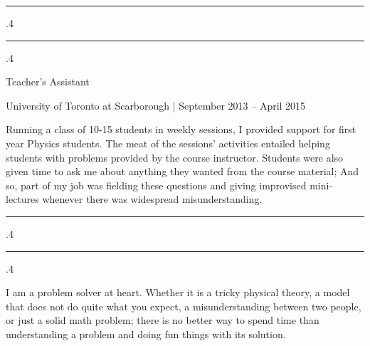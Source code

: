\documentclass[10pt]{article}
\makeatletter
\newcommand*\rulefill[1][.4\p@]{%
    \leavevmode
    \leaders \hrule \@height #1\relax \hfill
    \null
  }
\makeatother
\begin{document}
\begin{minipage}[t]{123mm}

\noindent
	\textcolor{black!20}{\rulefill\quad 
			{\fontsize{14}{25}\selectfont \textsl{}}
	\quad\rulefill}
\flushleft

\vspace{.35cm}

	{\fontsize{14}{20}\selectfont \textcolor{black!65}{Teacher's Assistant}}

\vspace{.1cm}

	{\fontsize{10}{12}\selectfont 
		\textcolor{black!65}{University of Toronto at Scarborough | September 2013 -- April 2015}}

\vspace{-0.75cm}

	{\fontsize{13}{16}\selectfont \textcolor{black!45}{
		\begin{justify}
			Running a class of 10-15 students in weekly sessions, I provided support for 
			first year Physics students. The meat of the sessions' activities entailed helping
			students with problems provided by the course instructor. Students were also 
			given time to ask me about anything they wanted from the course material; 
			And so, part of my job was fielding these questions and giving improvised 
			mini-lectures whenever there was widespread
			misunderstanding.
		\end{justify}}}
\end{minipage}
\hspace{5mm}
\begin{minipage}[t]{62mm}

	\textcolor{black!20}{\rulefill\quad 
		{\fontsize{14}{25}\selectfont \textsl{}} 
	\quad\rulefill}

	{\fontsize{13}{13}\selectfont \textcolor{black!45}{
		\begin{justify}
			I am a problem solver at heart. Whether it is a tricky physical theory, 
			a model that does not do quite what you expect,
			a misunderstanding between two people, or just a solid math problem;
			there is no better way to spend time than understanding a problem and
			doing fun things with its solution.
		\end{justify}}}
\end{minipage}

\vspace{.5cm}
\end{document}
